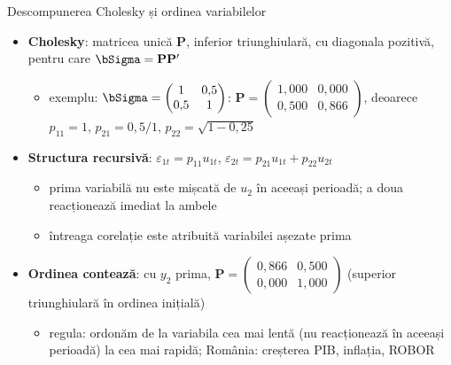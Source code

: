 \begin{frame}{Descompunerea Cholesky și ordinea variabilelor}
\itemsize{\small}
\begin{itemize}
    \item \textbf{Cholesky}: matricea unică $\mathbf{P}$, inferior triunghiulară, cu diagonala pozitivă, pentru care $\bSigma = \mathbf{P}\mathbf{P}'$
    \begin{itemize}
        \item exemplu: $\bSigma = \begin{pmatrix} 1 & 0{,}5 \\ 0{,}5 & 1 \end{pmatrix}$: $\mathbf{P} = \begin{pmatrix} 1{,}000 & 0{,}000 \\ 0{,}500 & 0{,}866 \end{pmatrix}$, deoarece $p_{11} = 1$, $p_{21} = 0{,}5/1$, $p_{22} = \sqrt{1 - 0{,}25}$
    \end{itemize}
    \item \textbf{Structura recursivă}: $\varepsilon_{1t} = p_{11}u_{1t}$, $\varepsilon_{2t} = p_{21}u_{1t} + p_{22}u_{2t}$
    \begin{itemize}
        \item prima variabilă nu este mișcată de $u_2$ în aceeași perioadă; a doua reacționează imediat la ambele
        \item întreaga corelație este atribuită variabilei așezate prima
    \end{itemize}
    \item \textbf{Ordinea contează}: cu $y_2$ prima, $\mathbf{P} = \begin{pmatrix} 0{,}866 & 0{,}500 \\ 0{,}000 & 1{,}000 \end{pmatrix}$ (superior triunghiulară în ordinea inițială)
    \begin{itemize}
        \item regula: ordonăm de la variabila cea mai lentă (nu reacționează în aceeași perioadă) la cea mai rapidă; România: creșterea PIB, inflația, ROBOR
    \end{itemize}
\end{itemize}
\end{frame}

